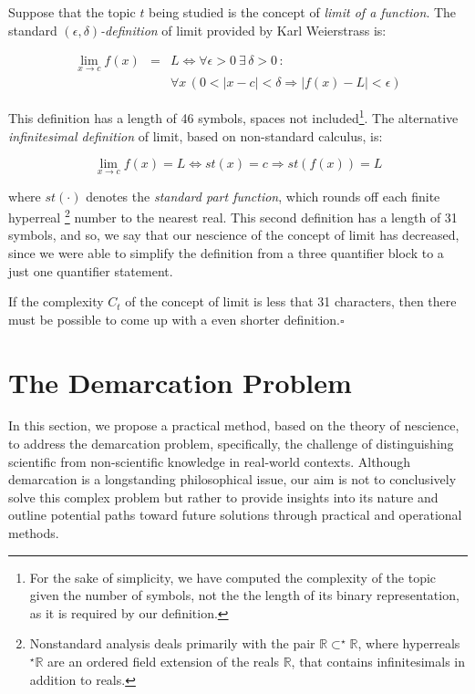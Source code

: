 \begin{example}
Suppose that the topic $t$ being studied is the concept of \emph{limit of a function}. The standard \emph{$\left(\epsilon,\delta\right)$-definition} of limit provided by Karl Weierstrass is:

\begin{eqnarray*}
\lim_{x\rightarrow c}f(x) & = & L\Leftrightarrow\forall\epsilon>0\:\exists\,\delta>0\,:\,\\
 &  & \forall x\,\left(0<\left|x-c\right|<\delta\Rightarrow\left|f(x)-L\right|<\epsilon\right)
\end{eqnarray*}


This definition has a length of 46 symbols, spaces not included\footnote{
For the sake of simplicity, we have computed the complexity of the
topic given the number of symbols, not the the length of its binary
representation, as it is required by our definition.}. The alternative \emph{infinitesimal definition} of limit, based
on non-standard calculus, is:

\[
\lim_{x\rightarrow c}f(x)=L\Leftrightarrow st(x)=c\Rightarrow st(f(x))=L
\]

where $st(\cdot)$ denotes the \emph{standard part function}, which \textquotedbl{}rounds off\textquotedbl{} each finite hyperreal%
\footnote{Nonstandard analysis deals primarily with the pair $\mathbb{R\subset^{\star}\mathbb{R}}$,
where hyperreals $^{\star}\mathbb{R}$ are an ordered field extension
of the reals $\mathbb{R}$, that contains infinitesimals in addition
to reals.%
} number to the nearest real. This second definition has a length of 31 symbols, and so, we say that our nescience of the concept of limit has decreased, since we were able to simplify the definition from a three quantifier block to a just one quantifier statement.

If the complexity $C_{t}$ of the concept of limit is less that 31 characters, then there must be possible to come up with a even shorter definition.\hfill{}$\square$
\end{example}


%
%
\section{The Demarcation Problem}

In this section, we propose a practical method, based on the theory of nescience, to address the demarcation problem, specifically, the challenge of distinguishing scientific from non-scientific knowledge in real-world contexts. Although demarcation is a longstanding philosophical issue, our aim is not to conclusively solve this complex problem but rather to provide insights into its nature and outline potential paths toward future solutions through practical and operational methods.

